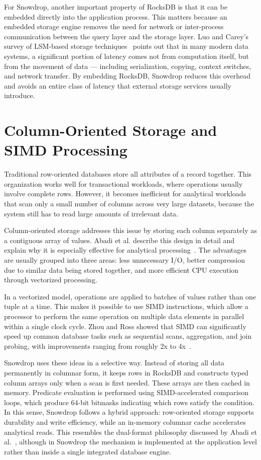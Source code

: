 For Snowdrop, another important property of RocksDB is that it can be embedded directly into the application process. This matters because an embedded storage engine removes the need for network or inter-process communication between the query layer and the storage layer. Luo and Carey’s survey of LSM-based storage techniques~\cite{luo2019} points out that in many modern data systems, a significant portion of latency comes not from computation itself, but from the movement of data --- including serialization, copying, context switches, and network transfer. By embedding RocksDB, Snowdrop reduces this overhead and avoids an entire class of latency that external storage services usually introduce.

\section{Column-Oriented Storage and SIMD Processing}

Traditional row-oriented databases store all attributes of a record together. This organization works well for transactional workloads, where operations usually involve complete rows. However, it becomes inefficient for analytical workloads that scan only a small number of columns across very large datasets, because the system still has to read large amounts of irrelevant data.

Column-oriented storage addresses this issue by storing each column separately as a contiguous array of values. Abadi et al. describe this design in detail and explain why it is especially effective for analytical processing~\cite{abadi2013}. The advantages are usually grouped into three areas: less unnecessary I/O, better compression due to similar data being stored together, and more efficient CPU execution through vectorized processing.

In a vectorized model, operations are applied to batches of values rather than one tuple at a time. This makes it possible to use SIMD instructions, which allow a processor to perform the same operation on multiple data elements in parallel within a single clock cycle. Zhou and Ross showed that SIMD can significantly speed up common database tasks such as sequential scans, aggregation, and join probing, with improvements ranging from roughly 2x to 4x~\cite{zhou2002}.

Snowdrop uses these ideas in a selective way. Instead of storing all data permanently in columnar form, it keeps rows in RocksDB and constructs typed column arrays only when a scan is first needed. These arrays are then cached in memory. Predicate evaluation is performed using SIMD-accelerated comparison loops, which produce 64-bit bitmasks indicating which rows satisfy the condition. In this sense, Snowdrop follows a hybrid approach: row-oriented storage supports durability and write efficiency, while an in-memory columnar cache accelerates analytical reads. This resembles the dual-format philosophy discussed by Abadi et al.~\cite{abadi2013}, although in Snowdrop the mechanism is implemented at the application level rather than inside a single integrated database engine.


